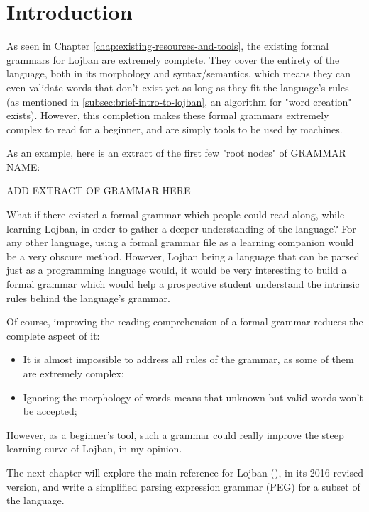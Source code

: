 \chapter{Introduction}

\vspace{0.5cm}

As seen in Chapter \ref{chap:existing-resources-and-tools}, the existing formal grammars for Lojban are extremely complete.
They cover the entirety of the language, both in its morphology and syntax/semantics, which means they can even validate words that don't exist yet
as long as they fit the language's rules (as mentioned in \ref{subsec:brief-intro-to-lojban}, an algorithm for "word creation" exists).
However, this completion makes these formal grammars extremely complex to read for a beginner, and are simply tools to be used by machines. \newline

As an example, here is an extract of the first few "root nodes" of GRAMMAR NAME: \newline

ADD EXTRACT OF GRAMMAR HERE \newline

What if there existed a formal grammar which people could read along, while learning Lojban, in order to gather a deeper
understanding of the language? For any other language, using a formal grammar file as a learning companion would be a very obscure method.
However, Lojban being a language that can be parsed just as a programming language would, it would be very interesting to build a formal grammar
which would help a prospective student understand the intrinsic rules behind the language's grammar. \newline

Of course, improving the reading comprehension of a formal grammar reduces the complete aspect of it:

\begin{itemize}
  \item It is almost impossible to address all rules of the grammar, as some of them are extremely complex;
  \item Ignoring the morphology of words means that unknown but valid words won't be accepted;
\end{itemize}

However, as a beginner's tool, such a grammar could really improve the steep learning curve of Lojban, in my opinion.\newline

The next chapter will explore the main reference for Lojban (\cite{cowan1997complete}), in its 2016 revised version, and write a simplified parsing expression grammar (PEG) for a subset of the language.


